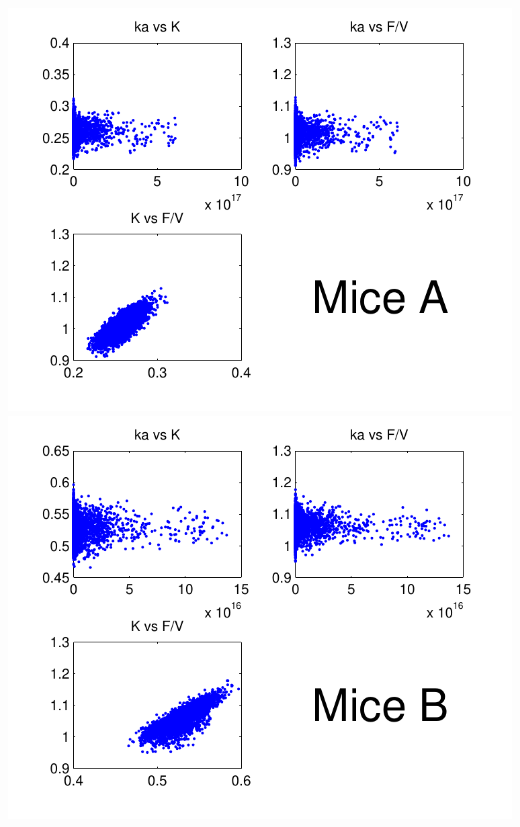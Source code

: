 \documentclass[t]{beamer}
\begin{document}
\begin{frame}[t]
\begin{columns}
  \includegraphics[width=\textwidth]{mice_a_joint_dists.pdf} \\
  \includegraphics[width=\textwidth]{mice_b_joint_dists.pdf}
  \end{columns}

\end{frame}

\end{document}
